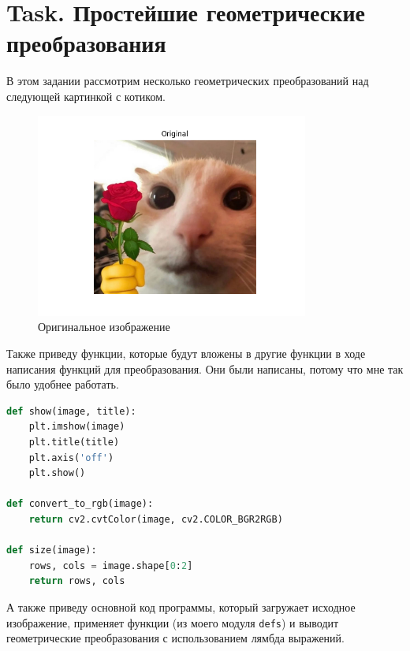 \documentclass[a4paper,12pt]{article}
\begin{document}
\section{Task. Простейшие геометрические преобразования}
В этом задании рассмотрим несколько геометрических преобразований над следующей картинкой с котиком.

\begin{figure}[htbp]
    \centering
    \includegraphics[width=0.8\textwidth]{lab2/task1/Figure_1.png}
    \caption{Оригинальное изображение}
    \label{fig:my_image}
\end{figure}

Также приведу функции, которые будут вложены в другие функции в ходе написания функций для преобразования. Они были написаны, потому что мне так было удобнее работать.

\begin{lstlisting}[language=Python, caption=Функции для удобства]
def show(image, title):
    plt.imshow(image)
    plt.title(title)
    plt.axis('off')
    plt.show()

def convert_to_rgb(image):
    return cv2.cvtColor(image, cv2.COLOR_BGR2RGB)

def size(image):
    rows, cols = image.shape[0:2]
    return rows, cols
\end{lstlisting}

А также приведу основной код программы, который загружает исходное изображение, применяет функции (из моего модуля \texttt{defs}) и выводит геометрические преобразования с использованием лямбда выражений.
\end{document}
